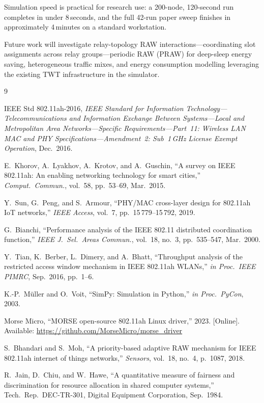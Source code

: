 \documentclass[conference]{IEEEtran}
\begin{document}
Simulation speed is practical for research use: a 200-node, 120-second
run completes in under 8\,seconds, and the full 42-run paper sweep
finishes in approximately 4\,minutes on a standard workstation.

Future work will investigate relay-topology RAW interactions---coordinating
slot assignments across relay groups---periodic RAW (PRAW) for deep-sleep
energy saving, heterogeneous traffic mixes, and energy consumption modelling
leveraging the existing TWT infrastructure in the simulator.

\balance
\begin{thebibliography}{9}

IEEE Std 802.11ah-2016,
\textit{IEEE Standard for Information Technology---Telecommunications and
Information Exchange Between Systems---Local and Metropolitan Area
Networks---Specific Requirements---Part~11: Wireless LAN MAC and PHY
Specifications---Amendment~2: Sub~1\,GHz License Exempt Operation},
Dec.\ 2016.

E.~Khorov, A.~Lyakhov, A.~Krotov, and A.~Guschin,
``A survey on IEEE 802.11ah: An enabling networking technology for smart
cities,''
\textit{Comput.\ Commun.}, vol.~58, pp.~53--69, Mar.\ 2015.

Y.~Sun, G.~Peng, and S.~Armour,
``PHY/MAC cross-layer design for 802.11ah IoT networks,''
\textit{IEEE Access}, vol.~7, pp.~15\,779--15\,792, 2019.

G.~Bianchi,
``Performance analysis of the IEEE 802.11 distributed coordination function,''
\textit{IEEE J.\ Sel.\ Areas Commun.}, vol.~18, no.~3, pp.~535--547,
Mar.\ 2000.

Y.~Tian, K.~Berber, L.~Dimery, and A.~Bhatt,
``Throughput analysis of the restricted access window mechanism in
IEEE 802.11ah WLANs,''
\textit{in Proc.\ IEEE PIMRC}, Sep.\ 2016, pp.~1--6.

K.-P.\ M\"{u}ller and O.~Voit,
``SimPy: Simulation in Python,''
\textit{in Proc.\ PyCon}, 2003.

Morse Micro,
``MORSE open-source 802.11ah Linux driver,'' 2023.
[Online]. Available: \url{https://github.com/MorseMicro/morse_driver}

S.~Bhandari and S.~Moh,
``A priority-based adaptive RAW mechanism for IEEE 802.11ah
internet of things networks,''
\textit{Sensors}, vol.~18, no.~4, p.~1087, 2018.

R.~Jain, D.~Chiu, and W.~Hawe,
``A quantitative measure of fairness and discrimination for resource
allocation in shared computer systems,''
Tech.\ Rep.\ DEC-TR-301, Digital Equipment Corporation, Sep.\ 1984.

\end{thebibliography}
\end{document}
